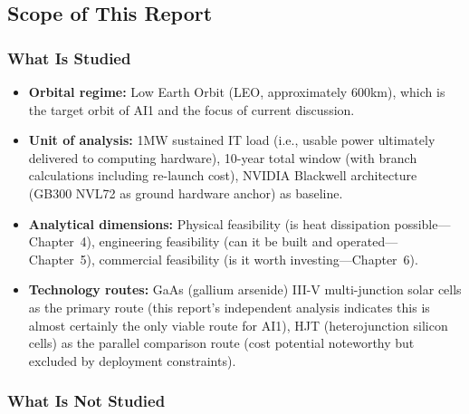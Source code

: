 \subsection{Scope of This Report}

\subsubsection{What Is Studied}

\begin{itemize}[leftmargin=*]
    \item \textbf{Orbital regime:} Low Earth Orbit (LEO, approximately 600\;km), which is the target orbit of AI1 and the focus of current discussion.
    \item \textbf{Unit of analysis:} 1\;MW sustained IT load (i.e., usable power ultimately delivered to computing hardware), 10-year total window (with branch calculations including re-launch cost), NVIDIA Blackwell architecture (GB300 NVL72 as ground hardware anchor) as baseline.
    \item \textbf{Analytical dimensions:} Physical feasibility (is heat dissipation possible---Chapter~4), engineering feasibility (can it be built and operated---Chapter~5), commercial feasibility (is it worth investing---Chapter~6).
    \item \textbf{Technology routes:} GaAs (gallium arsenide) III-V multi-junction solar cells as the primary route (this report's independent analysis indicates this is almost certainly the only viable route for AI1), HJT (heterojunction silicon cells) as the parallel comparison route (cost potential noteworthy but excluded by deployment constraints).
\end{itemize}

\subsubsection{What Is Not Studied}

